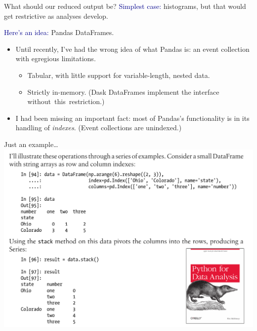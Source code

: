 \documentclass[aspectratio=169]{beamer}
\begin{document}
\begin{frame}{What should our reduced output be?}
\vspace{0.5 cm}
\textcolor{darkblue}{Simplest case:} histograms, but that would get restrictive as analyses develop.

\vspace{0.25 cm}
\textcolor{darkblue}{Here's an idea:} Pandas DataFrames.
\begin{itemize}
\item Until recently, I've had the wrong idea of what Pandas is: an event collection with egregious limitations.
\begin{itemize}
\item Tabular, with little support for variable-length, nested data.
\item Strictly in-memory. (Dask DataFrames implement the interface \mbox{without this restriction.)\hspace{-1 cm}}
\end{itemize}
\item I had been missing an important fact: most of Pandas's functionality is in its handling of {\it indexes}. (Event collections are unindexed.)
\end{itemize}
\end{frame}

\begin{frame}{Just an example\ldots}
\vspace{0.25 cm}
\mbox{ } \hfill \includegraphics[width=0.78\linewidth]{pandas-book.png} \hfill \mbox{ }
\end{frame}
\end{document}
